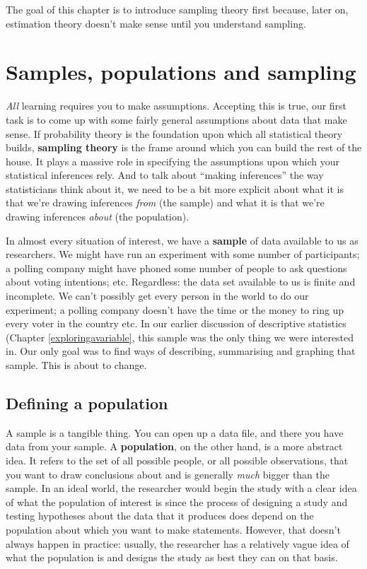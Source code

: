 \documentclass[
]{book}
\theoremstyle{definition}
\theoremstyle{definition}
\theoremstyle{definition}
\theoremstyle{definition}
\theoremstyle{remark}
\begin{document}
The goal of this chapter is to introduce sampling theory first because, later on, estimation theory doesn't make sense until you understand sampling.

\hypertarget{srs}{%
\section{Samples, populations and sampling}\label{srs}}

\emph{All} learning requires you to make assumptions. Accepting this is true, our first task is to come up with some fairly general assumptions about data that make sense. If probability theory is the foundation upon which all statistical theory builds, \textbf{sampling theory} is the frame around which you can build the rest of the house. It plays a massive role in specifying the assumptions upon which your statistical inferences rely. And to talk about ``making inferences'' the way statisticians think about it, we need to be a bit more explicit about what it is that we're drawing inferences \emph{from} (the sample) and what it is that we're drawing inferences \emph{about} (the population).

In almost every situation of interest, we have a \textbf{sample} of data available to us as researchers. We might have run an experiment with some number of participants; a polling company might have phoned some number of people to ask questions about voting intentions; etc. Regardless: the data set available to us is finite and incomplete. We can't possibly get every person in the world to do our experiment; a polling company doesn't have the time or the money to ring up every voter in the country etc. In our earlier discussion of descriptive statistics (Chapter \ref{exploringavariable}, this sample was the only thing we were interested in. Our only goal was to find ways of describing, summarising and graphing that sample. This is about to change.

\hypertarget{pop}{%
\subsection{Defining a population}\label{pop}}

A sample is a tangible thing. You can open up a data file, and there you have data from your sample. A \textbf{population}, on the other hand, is a more abstract idea. It refers to the set of all possible people, or all possible observations, that you want to draw conclusions about and is generally \emph{much} bigger than the sample. In an ideal world, the researcher would begin the study with a clear idea of what the population of interest is since the process of designing a study and testing hypotheses about the data that it produces does depend on the population about which you want to make statements. However, that doesn't always happen in practice: usually, the researcher has a relatively vague idea of what the population is and designs the study as best they can on that basis.
\end{document}
